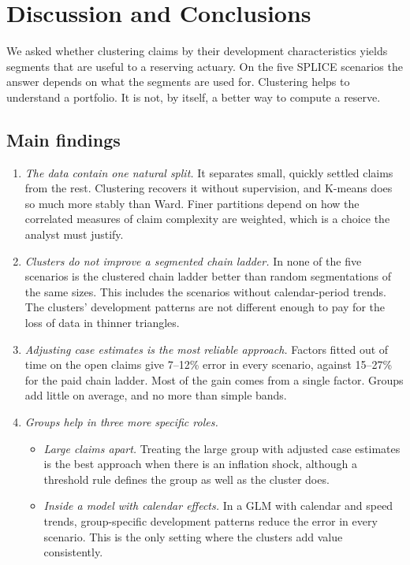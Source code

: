 \section{Discussion and Conclusions}
\label{conclusion}

We asked whether clustering claims by their development characteristics yields segments that are useful to a reserving actuary. On the five SPLICE scenarios the answer depends on what the segments are used for. Clustering helps to understand a portfolio. It is not, by itself, a better way to compute a reserve.

\subsection{Main findings}

\begin{enumerate}[leftmargin=*]
\item \emph{The data contain one natural split.} It separates small, quickly settled claims from the rest. Clustering recovers it without supervision, and K-means does so much more stably than Ward. Finer partitions depend on how the correlated measures of claim complexity are weighted, which is a choice the analyst must justify.
\item \emph{Clusters do not improve a segmented chain ladder.} In none of the five scenarios is the clustered chain ladder better than random segmentations of the same sizes. This includes the scenarios without calendar-period trends. The clusters' development patterns are not different enough to pay for the loss of data in thinner triangles.
\item \emph{Adjusting case estimates is the most reliable approach.} Factors fitted out of time on the open claims give 7--12\% error in every scenario, against 15--27\% for the paid chain ladder. Most of the gain comes from a single factor. Groups add little on average, and no more than simple bands.
\item \emph{Groups help in three more specific roles.}
  \begin{itemize}[leftmargin=*]
  \item \emph{Large claims apart.} Treating the large group with adjusted case estimates is the best approach when there is an inflation shock, although a threshold rule defines the group as well as the cluster does.
  \item \emph{Inside a model with calendar effects.} In a GLM with calendar and speed trends, group-specific development patterns reduce the error in every scenario. This is the only setting where the clusters add value consistently.

\end{itemize}
\end{enumerate}
